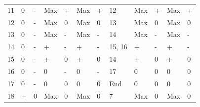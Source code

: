 \documentclass{article}
\begin{document}
\begin{table}
\begin{adjustbox}{center}
\begin{tabular}{@{}llllllllllll}
		11 & 0      & -           & Max    & +           & Max     & +            & 12       & Max    & +                                & Max      & +                                   \\
		12 & 0      & -           & Max    & 0           & Max     & 0            & 13       & Max    & 0                                & Max      & 0                                   \\
		13 & 0      & -           & Max    & -           & Max     & -            & 14       & Max    & -                                & Max      & -                                   \\
		14 & 0      & -           & +      & -           & +       & -            & 15, 16   & +      & -                                & +        & -                                   \\
		15 & 0      & -           & +      & 0           & +       & 0            & 14       & +      & 0                                & +        & 0                                   \\
		16 & 0      & -           & 0      & -           & 0       & -            & 17       & 0      & 0                                & 0        & 0                                   \\
		17 & 0      & -           & 0      & 0           & 0       & 0            & End      & 0      & 0                                & 0        & 0                                   \\
		18 & +      & 0           & Max    & 0           & Max     & 0            & 7        & Max    & 0                                & Max      & 0                                  
	\end{tabular}
	\end{adjustbox}
\end{table}
\end{document}
